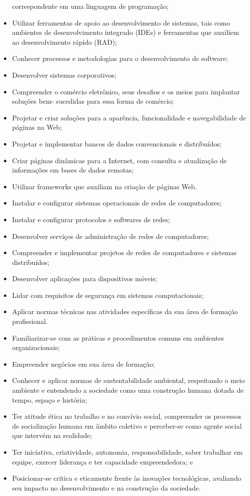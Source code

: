 \begin{itemize}
correspondente em uma linguagem de programação;
	\item Utilizar ferramentas de apoio ao desenvolvimento de sistemas, tais como ambientes de
desenvolvimento integrado (IDEs) e ferramentas que auxiliem ao desenvolvimento rápido
(RAD);
	\item Conhecer processos e metodologias para o desenvolvimento de software;
	\item Desenvolver sistemas corporativos;
	\item Compreender o comércio eletrônico, seus desafios e os meios para implantar soluções bem-
sucedidas para essa forma de comércio;
	\item Projetar e criar soluções para a aparência, funcionalidade e navegabilidade de páginas na
Web;
	\item Projetar e implementar bancos de dados convencionais e distribuídos;
	\item Criar páginas dinâmicas para a Internet, com consulta e atualização de informações em
bases de dados remotas;
	\item Utilizar frameworks que auxiliam na criação de páginas Web.
	\item Instalar e configurar sistemas operacionais de redes de computadores;
	\item Instalar e configurar protocolos e softwares de redes;
	\item Desenvolver serviços de administração de redes de computadores;
	\item Compreender e implementar projetos de redes de computadores e sistemas distribuídos;
	\item Desenvolver aplicações para dispositivos móveis;
	\item Lidar com requisitos de segurança em sistemas computacionais;
	\item Aplicar normas técnicas nas atividades específicas da sua área de formação profissional.
	\item Familiarizar-se com as práticas e procedimentos comuns em ambientes organizacionais;
	\item Empreender negócios em sua área de formação;
	\item Conhecer e aplicar normas de sustentabilidade ambiental, respeitando o meio ambiente e entendendo a sociedade como uma construção humana dotada de tempo, espaço e história;
	\item Ter atitude ética no trabalho e no convívio social, compreender os processos de socialização humana em âmbito coletivo e perceber-se como agente social que intervém na realidade;
	\item Ter iniciativa, criatividade, autonomia, responsabilidade, saber trabalhar em equipe, exercer liderança e ter capacidade empreendedora; e
	\item Posicionar-se critica e eticamente frente às inovações tecnológicas, avaliando seu impacto no desenvolvimento e na construção da sociedade.
\end{itemize}

